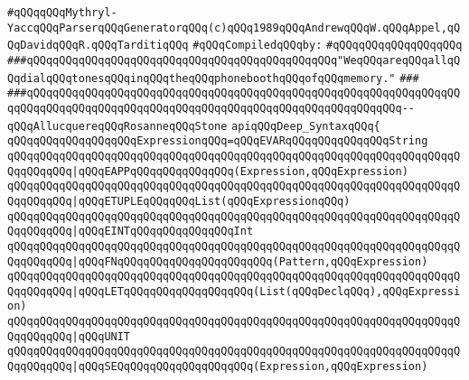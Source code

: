 \label{src/app/yacc/src/deep-syntax.api}
\verb|#qQQqqQQqMythryl-YaccqQQqParserqQQqGeneratorqQQq(c)qQQq1989qQQqAndrewqQQqW.qQQqAppel,qQQqDavidqQQqR.qQQqTarditiqQQq|\newline
\newline
\verb|#qQQqCompiledqQQqby:|\newline
\verb|#qQQqqQQqqQQqqQQqqQQq|\newline
\newline
\verb|###qQQqqQQqqQQqqQQqqQQqqQQqqQQqqQQqqQQqqQQqqQQqqQQq"WeqQQqareqQQqallqQQqdialqQQqtonesqQQqinqQQqtheqQQqphoneboothqQQqofqQQqmemory."|\newline
\verb|###|\newline
\verb|###qQQqqQQqqQQqqQQqqQQqqQQqqQQqqQQqqQQqqQQqqQQqqQQqqQQqqQQqqQQqqQQqqQQqqQQqqQQqqQQqqQQqqQQqqQQqqQQqqQQqqQQqqQQqqQQqqQQqqQQqqQQqqQQq--qQQqAllucquereqQQqRosanneqQQqStone|\newline
\newline
\newline
\newline
\verb|apiqQQqDeep_SyntaxqQQq{|\newline
\newline
\verb|qQQqqQQqqQQqqQQqqQQqExpressionqQQq=qQQqEVARqQQqqQQqqQQqqQQqString|\newline
\verb|qQQqqQQqqQQqqQQqqQQqqQQqqQQqqQQqqQQqqQQqqQQqqQQqqQQqqQQqqQQqqQQqqQQqqQQqqQQqqQQq|\verb#|qQQqEAPPqQQqqQQqqQQqqQQq(Expression,qQQqExpression)#\newline
\verb|qQQqqQQqqQQqqQQqqQQqqQQqqQQqqQQqqQQqqQQqqQQqqQQqqQQqqQQqqQQqqQQqqQQqqQQqqQQqqQQq|\verb#|qQQqETUPLEqQQqqQQqList(qQQqExpressionqQQq)#\newline
\verb|qQQqqQQqqQQqqQQqqQQqqQQqqQQqqQQqqQQqqQQqqQQqqQQqqQQqqQQqqQQqqQQqqQQqqQQqqQQqqQQq|\verb#|qQQqEINTqQQqqQQqqQQqqQQqInt#\newline
\verb|qQQqqQQqqQQqqQQqqQQqqQQqqQQqqQQqqQQqqQQqqQQqqQQqqQQqqQQqqQQqqQQqqQQqqQQqqQQqqQQq|\verb#|qQQqFNqQQqqQQqqQQqqQQqqQQqqQQq(Pattern,qQQqExpression)#\newline
\verb|qQQqqQQqqQQqqQQqqQQqqQQqqQQqqQQqqQQqqQQqqQQqqQQqqQQqqQQqqQQqqQQqqQQqqQQqqQQqqQQq|\verb#|qQQqLETqQQqqQQqqQQqqQQqqQQq(List(qQQqDeclqQQq),qQQqExpression)#\newline
\verb|qQQqqQQqqQQqqQQqqQQqqQQqqQQqqQQqqQQqqQQqqQQqqQQqqQQqqQQqqQQqqQQqqQQqqQQqqQQqqQQq|\verb#|qQQqUNIT#\newline
\verb|qQQqqQQqqQQqqQQqqQQqqQQqqQQqqQQqqQQqqQQqqQQqqQQqqQQqqQQqqQQqqQQqqQQqqQQqqQQqqQQq|\verb#|qQQqSEQqQQqqQQqqQQqqQQqqQQq(Expression,qQQqExpression)#\newline
